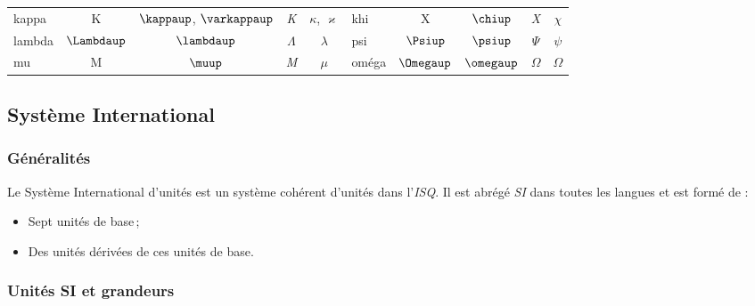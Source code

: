 \documentclass[a4paper, 11pt, twoside, fleqn]{memoir}
\begin{document}
\begin{table}[h!]
\begin{tabularx}{\textwidth}[t]{l C C C C l C C C C}
kappa					& K						& $\kappaup$, $\varkappaup$				& \textit{K}							& $\kappa$, $\varkappa$ 		& khi						& X						& $\chiup$												& \textit{X}							& $\chi$ \\
lambda					& $\Lambdaup$		& $\lambdaup$										& $\mathit{\Lambda}$			& $\lambda$							& psi						& $\Psiup$				& $\psiup$												& $\mathit{\Psi}$					& $\psi$ \\
mu						& M						& $\muup$											& \textit{M}							& $\mu$								& oméga					& $\Omegaup$		& $\omegaup$										& $\mathit{\Omega}$			& $\Omega$ \\
\cmidrule[\heavyrulewidth](lr){1-5} \cmidrule[\heavyrulewidth](lr){6-10}
\end{tabularx}
\end{table}


\subsection{Système International}
\label{subsec:systeme_international}

\subsubsection{Généralités}

Le Système International d'unités est un système cohérent d'unités dans l'\emph{ISQ}. Il est abrégé \emph{SI} dans toutes les langues et est formé de :
\begin{itemize}
\item Sept unités de base\,;
\item Des unités dérivées de ces unités de base.
\end{itemize}

\subsubsection{Unités SI et grandeurs}
\end{document}
